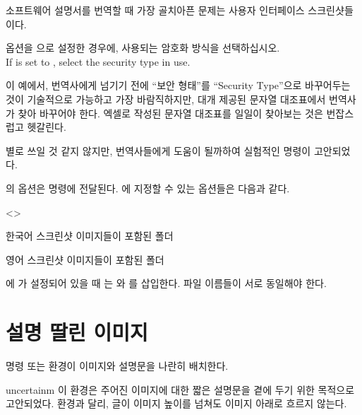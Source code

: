 \documentclass[minted]{hzguide}
\begin{document}
소프트웨어 설명서를 번역할 때 가장 골치아픈 문제는 사용자 인터페이스 스크린샷들이다.

\begin{reference}
 옵션을 으로 설정한 경우에, 사용되는 암호화 방식을 선택하십시오. \\
If  is set to , select the security type in use.
\end{reference}

이 예에서, 번역사에게 넘기기 전에 ``보안 형태''를 ``Security Type''으로 바꾸어두는 것이 기술적으로 가능하고 가장 바람직하지만, 
대개 제공된 문자열 대조표에서 번역사가 찾아 바꾸어야 한다.
엑셀로 작성된 문자열 대조표를 일일이 찾아보는 것은 번잡스럽고 헷갈린다.

별로 쓰일 것 같지 않지만, 번역사들에게 도움이 될까하여 실험적인 \macro{\mateimage} 명령이 고안되었다.

\begin{code}
\end{code}

\macro{\mateimage}의 옵션은 \macro{\image} 명령에 전달된다.
\macro{\MateSetup}에 지정할 수 있는 옵션들은 다음과 같다.

\begin{macros}<\MateSetup>
\item[mate] 
\item[firstpath] 
한국어 스크린샷 이미지들이 포함된 폴더
\item[secondpath] 
영어 스크린샷 이미지들이 포함된 폴더
\end{macros}

에 가 설정되어 있을 때 는 와 를 삽입한다.
파일 이름들이 서로 동일해야 한다.

\section{설명 딸린 이미지}

\macro{\illustimage} 명령 또는  환경이 이미지와 설명문을 나란히 배치한다.

\begin{coderesult}
\begin{IllustImage}{uncertainm}
이 환경은 주어진 이미지에 대한 짧은 설명문을 곁에 두기 위한 목적으로 고안되었다.
 환경과 달리, 글이 이미지 높이를 넘쳐도 이미지 아래로 흐르지 않는다.
\end{IllustImage}
\end{coderesult}
\end{document}
